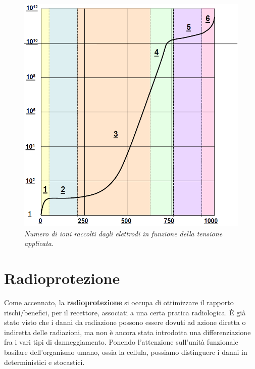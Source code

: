\documentclass{report}
\numberwithin{equation}{section}
\numberwithin{figure}{section}
\begin{document}
\begin{figure}[htp]
\centering
\includegraphics[scale=0.51]{immagini/ioniz.png}
\caption{\label{fig:ioniz} \textit{Numero di ioni raccolti dagli elettrodi in funzione della tensione applicata}.}
\end{figure}

\section{Radioprotezione}
Come accennato, la \textbf{radioprotezione} si occupa di ottimizzare il rapporto rischi/benefici, per il recettore, associati a una certa pratica radiologica. È già stato visto che i danni da radiazione possono essere dovuti ad azione diretta o indiretta delle radiazioni, ma non è ancora stata introdotta una differenziazione fra i vari tipi di danneggiamento. Ponendo l'attenzione sull'unità funzionale basilare dell'organismo umano, ossia la cellula, possiamo distinguere i danni in deterministici e stocastici.
\end{document}
